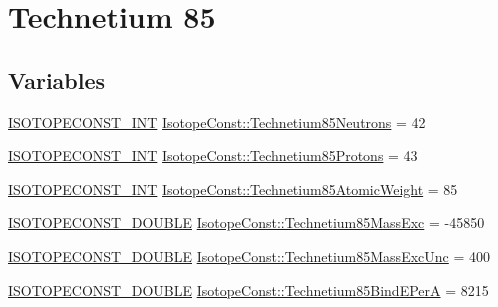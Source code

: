 \hypertarget{group___isotope_const-_technetium-_tc85}{}\section{Technetium 85}
\label{group___isotope_const-_technetium-_tc85}
\subsection*{Variables}
\begin{DoxyCompactItemize}
\item 
\mbox{\hyperlink{group___isotope_const-_macros_ga5f18360b3e99483a35c32d789e62621c}{I\+S\+O\+T\+O\+P\+E\+C\+O\+N\+S\+T\+\_\+\+I\+NT}} \mbox{\hyperlink{group___isotope_const-_technetium-_tc85_ga9706cb15138efb9c328612b9f811cd1b}{Isotope\+Const\+::\+Technetium85\+Neutrons}} = 42
\item 
\mbox{\hyperlink{group___isotope_const-_macros_ga5f18360b3e99483a35c32d789e62621c}{I\+S\+O\+T\+O\+P\+E\+C\+O\+N\+S\+T\+\_\+\+I\+NT}} \mbox{\hyperlink{group___isotope_const-_technetium-_tc85_ga97fec6e2dc7e27e03b7b13a23d1974a0}{Isotope\+Const\+::\+Technetium85\+Protons}} = 43
\item 
\mbox{\hyperlink{group___isotope_const-_macros_ga5f18360b3e99483a35c32d789e62621c}{I\+S\+O\+T\+O\+P\+E\+C\+O\+N\+S\+T\+\_\+\+I\+NT}} \mbox{\hyperlink{group___isotope_const-_technetium-_tc85_ga3a9a4666a9a1212a47209bd3ee9772ac}{Isotope\+Const\+::\+Technetium85\+Atomic\+Weight}} = 85
\item 
\mbox{\hyperlink{group___isotope_const-_macros_ga8f45a7272ce02c0b4c65c44636ed719a}{I\+S\+O\+T\+O\+P\+E\+C\+O\+N\+S\+T\+\_\+\+D\+O\+U\+B\+LE}} \mbox{\hyperlink{group___isotope_const-_technetium-_tc85_ga9e9aaa31b6b2eb4430b5d2d8f36ed8d9}{Isotope\+Const\+::\+Technetium85\+Mass\+Exc}} = -\/45850
\item 
\mbox{\hyperlink{group___isotope_const-_macros_ga8f45a7272ce02c0b4c65c44636ed719a}{I\+S\+O\+T\+O\+P\+E\+C\+O\+N\+S\+T\+\_\+\+D\+O\+U\+B\+LE}} \mbox{\hyperlink{group___isotope_const-_technetium-_tc85_gae1eb63472b85385c2d8d7cf29ac0cbdb}{Isotope\+Const\+::\+Technetium85\+Mass\+Exc\+Unc}} = 400
\item 
\mbox{\hyperlink{group___isotope_const-_macros_ga8f45a7272ce02c0b4c65c44636ed719a}{I\+S\+O\+T\+O\+P\+E\+C\+O\+N\+S\+T\+\_\+\+D\+O\+U\+B\+LE}} \mbox{\hyperlink{group___isotope_const-_technetium-_tc85_gacaa3f7e77c052ae30288c5c03e8f93be}{Isotope\+Const\+::\+Technetium85\+Bind\+E\+PerA}} = 8215
\item 

\end{DoxyCompactItemize}
